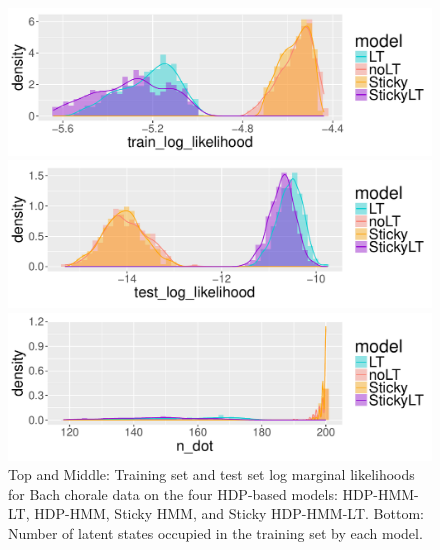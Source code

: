 \begin{figure}[tb]
\begin{center}
  \centerline{\includegraphics[width = 0.75\columnwidth]{fig/music/bach/lambda5/train_log_likelihood_density.pdf}}
  \centerline{\includegraphics[width = 0.75\columnwidth]{fig/music/bach/lambda5/test_log_likelihood_density.pdf}}
  \centerline{\includegraphics[width = 0.75\columnwidth]{fig/music/bach/lambda5/n_dot_density.pdf}}
\caption{Top and Middle: Training set and test set log marginal likelihoods for Bach
  chorale data on the four HDP-based models: HDP-HMM-LT, HDP-HMM,
  Sticky HMM, and Sticky HDP-HMM-LT.  Bottom: Number of latent states
  occupied in the training set by each model. \label{fig:bach-metric}
}
\end{center}
\end{figure}
